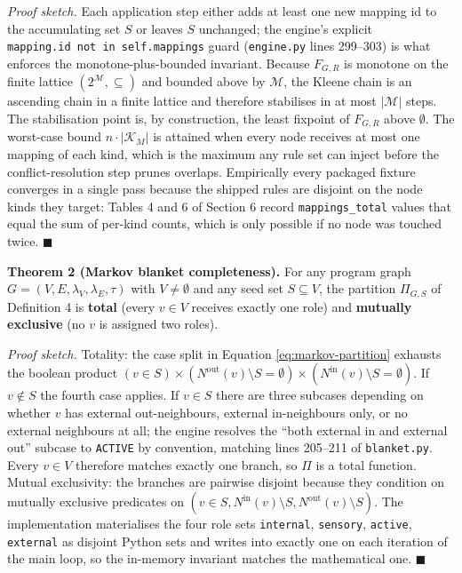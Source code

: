 \documentclass[
]{article}
\begin{document}
\emph{Proof sketch.} Each application step either adds at least one new
mapping id to the accumulating set \(S\) or leaves \(S\) unchanged; the
engine's explicit \texttt{mapping.id\ not\ in\ self.mappings} guard
(\texttt{engine.py} lines 299--303) is what enforces the
monotone-plus-bounded invariant. Because \(F_{G,R}\) is monotone on the
finite lattice \((2^{\mathcal{M}}, \subseteq)\) and bounded above by
\(\mathcal{M}\), the Kleene chain is an ascending chain in a finite
lattice and therefore stabilises in at most \(|\mathcal{M}|\) steps. The
stabilisation point is, by construction, the least fixpoint of
\(F_{G,R}\) above \(\emptyset\). The worst-case bound
\(n \cdot |\mathcal{K}_M|\) is attained when every node receives at most
one mapping of each kind, which is the maximum any rule set can inject
before the conflict-resolution step prunes overlaps. Empirically every
packaged fixture converges in a single pass because the shipped rules
are disjoint on the node kinds they target: Tables 4 and 6 of Section 6
record \texttt{mappings\_total} values that equal the sum of per-kind
counts, which is only possible if no node was touched twice.
\(\blacksquare\)

\textbf{Theorem 2 (Markov blanket completeness).} For any program graph
\(G = (V, E, \lambda_V, \lambda_E, \tau)\) with \(V \neq \emptyset\) and
any seed set \(S \subseteq V\), the partition \(\Pi_{G, S}\) of
Definition 4 is \textbf{total} (every \(v \in V\) receives exactly one
role) and \textbf{mutually exclusive} (no \(v\) is assigned two roles).

\emph{Proof sketch.} Totality: the case split in Equation
\ref{eq:markov-partition} exhausts the boolean product
\((v \in S) \times (N^{\text{out}}(v) \setminus S = \emptyset) \times (N^{\text{in}}(v) \setminus S = \emptyset)\).
If \(v \notin S\) the fourth case applies. If \(v \in S\) there are
three subcases depending on whether \(v\) has external out-neighbours,
external in-neighbours only, or no external neighbours at all; the
engine resolves the ``both external in and external out'' subcase to
\texttt{ACTIVE} by convention, matching lines 205--211 of
\texttt{blanket.py}. Every \(v \in V\) therefore matches exactly one
branch, so \(\Pi\) is a total function. Mutual exclusivity: the branches
are pairwise disjoint because they condition on mutually exclusive
predicates on
\((v \in S, N^{\text{in}}(v) \setminus S, N^{\text{out}}(v) \setminus S)\).
The implementation materialises the four role sets \texttt{internal},
\texttt{sensory}, \texttt{active}, \texttt{external} as disjoint Python
sets and writes into exactly one on each iteration of the main loop, so
the in-memory invariant matches the mathematical one. \(\blacksquare\)
\end{document}
